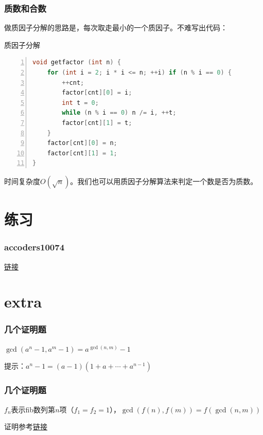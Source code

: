 \documentclass{ctexbeamer}        %
\begin{document}
\begin{frame}[fragile]
\frametitle{质数和合数}

做质因子分解的思路是，每次取走最小的一个质因子。不难写出代码：
\begin{block}{质因子分解}
\begin{lstlisting}[language={c++},
                   numbers=left]
void getfactor (int n) {
    for (int i = 2; i * i <= n; ++i) if (n % i == 0) {
        ++cnt;
        factor[cnt][0] = i;
        int t = 0;
        while (n % i == 0) n /= i, ++t;
        factor[cnt][1] = t;
    }
    factor[cnt][0] = n;
    factor[cnt][1] = 1;
}
\end{lstlisting}
\end{block}
时间复杂度$O(\sqrt{n})$。我们也可以用质因子分解算法来判定一个数是否为质数。
\end{frame}

\section{练习}

\begin{frame}[fragile]
\frametitle{accoders10074}
\href{http://www.accoders.com/problem.php?id=10074}{链接}
\end{frame}

\section{extra}

\begin{frame}[fragile]
\frametitle{几个证明题}
\begin{example}
    $\gcd(a^n-1,a^m-1)=a^{\gcd(n,m)}-1$
\end{example}
\pause
提示：$a^n-1=(a-1)(1+a+\cdots+a^{n-1})$
\end{frame}

\begin{frame}[fragile]
\frametitle{几个证明题}
\begin{example}
    $f_n$表示fib数列第$n$项（$f_1=f_2=1$），$\gcd(f(n),f(m))=f(\gcd(n,m))$
\end{example}
\pause
证明参考\href{https://www.cnblogs.com/ljc20020730/p/10126623.html}{链接}
\end{frame}
\end{document}
